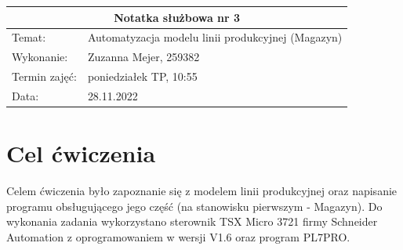\documentclass[12pt]{article}
\begin{document}
\newcommand{\zdjecie}[3]
{
    \begin{figure}[H]
        \renewcommand{\figurename}{Rys.}
        \centering
        \texttt{[image: \#1]}
        \caption{#2}
        \label{#3}
    \end{figure}
}

\begin{table}[H]
    \centering
    \renewcommand{\arraystretch}{1.5}
    \begin{tabularx}{\textwidth}{|X|X|}
    \hline
    \multicolumn{2}{|c|}{\large\textbf{Notatka służbowa nr 3}} \\ \hline
    Temat:          & Automatyzacja modelu linii produkcyjnej (Magazyn)    \\ \hline
    Wykonanie:      & Zuzanna Mejer, 259382   \\ \hline
    Termin zajęć:   & poniedziałek TP, 10:55  \\ \hline  
    Data:           & 28.11.2022    \\ \hline
    \end{tabularx}
    \end{table}

\section{Cel ćwiczenia}
Celem ćwiczenia było zapoznanie się z modelem linii produkcyjnej oraz napisanie programu obsługującego jego część (na stanowisku pierwszym - Magazyn). Do wykonania zadania wykorzystano sterownik TSX Micro 3721 firmy Schneider Automation z oprogramowaniem w wersji V1.6 oraz program PL7PRO.
\end{document}
